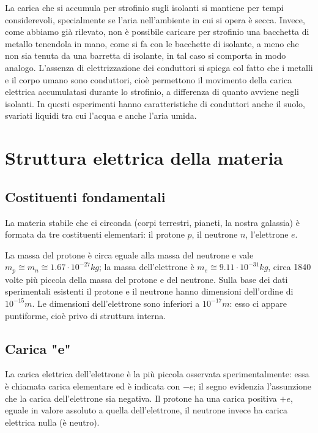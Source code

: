 \documentclass[class=book, crop=false, oneside, 12pt]{standalone}
\begin{document}
La carica che si accumula per strofinio sugli isolanti si mantiene per tempi considerevoli, specialmente se l'aria nell'ambiente in cui si opera è secca. 
Invece, come abbiamo già rilevato, non è possibile caricare per strofinio una bacchetta di metallo tenendola in mano, come si fa con le bacchette di isolante, a meno che non sia tenuta da una barretta di isolante, in tal caso si comporta in modo analogo.
L'assenza di elettrizzazione dei conduttori si spiega col fatto che i metalli e il corpo umano sono conduttori, cioè permettono il movimento della carica elettrica accumulatasi durante lo strofinio, a differenza di quanto avviene negli isolanti.
In questi esperimenti hanno caratteristiche di conduttori anche il suolo, svariati liquidi tra cui l'acqua e anche l'aria umida.

\section{Struttura elettrica della materia}

\subsection{Costituenti fondamentali}

La materia stabile che ci circonda (corpi terrestri, pianeti, la nostra galassia) è formata da tre costituenti elementari: il protone $p$, il neutrone $n$, l'elettrone $e$.

La massa del protone è circa eguale alla massa del neutrone e vale \(m_p \cong m_n \cong 1.67 \cdot 10^{-27} kg \); la massa dell'elettrone è \(m_e \cong 9.11 \cdot 10^{-31} kg\), circa 1840 volte più piccola della massa del protone e del neutrone.
Sulla base dei dati sperimentali esistenti il protone e il neutrone hanno dimensioni dell'ordine di \(10^{-15} m\).
Le dimensioni dell'elettrone sono inferiori a \(10^{-17} m\): esso ci appare puntiforme, cioè privo di struttura interna.

\subsection{Carica "e"}

La carica elettrica dell'elettrone è la più piccola osservata sperimentalmente: essa è chiamata carica elementare ed è indicata con \(-e\); il segno evidenzia l'assunzione che la carica dell'elettrone sia negativa. 
Il protone ha una carica positiva \(+e\), eguale in valore assoluto a quella dell'elettrone, il neutrone invece ha carica elettrica nulla (è neutro).
\end{document}

